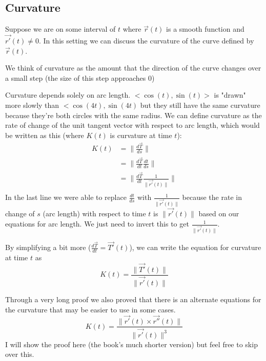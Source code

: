 \documentclass[12 pt]{article}
\begin{document}
        \subsection{Curvature}

        Suppose we are on some interval of $t$ where $\vec{r}(t)$ is a smooth function and $\vec{r'}(t)\neq 0$. In this setting we can discuss the curvature of the curve defined by $\vec{r}(t)$.

        We think of curvature as the amount that the direction of the curve changes over a small step (the size of this step approaches 0)

        Curvature depends solely on arc length. $<\cos(t),\sin(t)>$ is "drawn" more slowly than $<\cos(4t),\sin(4t)$ but they still have the same curvature because they're both circles with the same radius. We can define curvature as the rate of change of the unit tangent vector with respect to arc length, which would be written as this (where $K(t)$ is curvature at time $t$):
        \begin{align*}
            K(t)&=\parallel\frac{d\vec{T}}{ds}\parallel\\
            &=\parallel\frac{d\vec{T}}{dt}\frac{dt}{ds}\parallel\\
            &=\parallel\frac{d\vec{T}}{dt}\frac{1}{\parallel\vec{r'}(t)\parallel}\parallel\\
        \end{align*}
        In the last line we were able to replace $\frac{dt}{ds}$ with $\frac{1}{\parallel\vec{r'}(t)\parallel}$ because the rate in change of $s$ (arc length) with respect to time $t$ is $\parallel\vec{r'}(t)\parallel$ based on our equations for arc length. We just need to invert this to get $\frac{1}{\parallel\vec{r'}(t)\parallel}$.

        By simplifying a bit more ($\frac{d\vec{T}}{dt}=\vec{T'}(t)$), we can write the equation for curvature at time $t$ as
        $$K(t)=\frac{\parallel\vec{T'}(t)\parallel}{\parallel\vec{r'}(t)\parallel}$$

        Through a very long proof we also proved that there is an alternate equations for the curvature that may be easier to use in some cases.
        $$K(t)=\frac{\parallel\vec{r'}(t)\times\vec{r''}(t)\parallel}{\parallel\vec{r'}(t)\parallel^3}$$
        I will show the proof here (the book's much shorter version) but feel free to skip over this.
\end{document}
